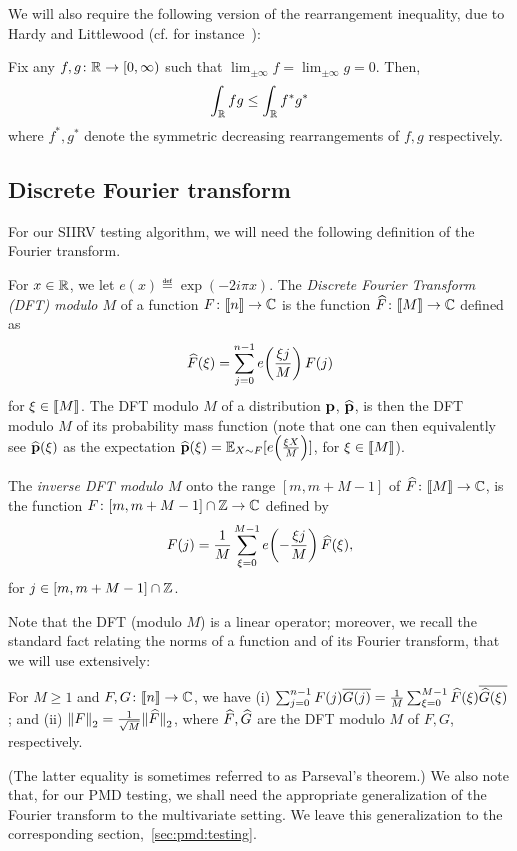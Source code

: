 We will also require the following version of the rearrangement inequality, due to Hardy and Littlewood (cf. for instance~\cite[Theorem 2.2]{BennettS:88}):
  \begin{theorem}\label{theo:hardy:littlewood}
    Fix any $f,g\colon\mathbb{R}\to [0,\infty)$ such that $\lim_{\pm\infty} f = \lim_{\pm\infty} g = 0$. Then,
    \[
        \int_{\mathbb{R}} fg \leq \int_{\mathbb{R}} f^\ast g^\ast
    \]
    where $f^\ast, g^\ast$ denote the symmetric decreasing rearrangements of $f,g$ respectively.
  \end{theorem}
  
\subsection{Discrete Fourier transform}
For our SIIRV testing algorithm, we will need the following definition of the Fourier transform. 

\begin{definition}
For $x \in \mathbb{R}$, we let $e(x) \eqdef  \exp(-2i\pi x)$. The \emph{Discrete Fourier Transform (DFT) modulo $M$} of a function
$F\colon\llbracket n\rrbracket \to \mathbb{C}$ is  the function $\widehat{F}\colon\llbracket M\rrbracket\to \mathbb{C}$ defined as
\[
    \widehat{F}(\xi)=\sum_{j=0}^{n-1} e\!\left(\frac{\xi j}{M}\right) F(j)
\]
for $\xi \in \llbracket M\rrbracket$. The DFT modulo $M$ of a distribution $\mathbf{p}$, $\widehat{\mathbf{p}}$, is then the DFT modulo $M$ of its probability mass function (note that one can then equivalently see $\widehat{\mathbf{p}}(\xi)$ as the expectation $\widehat{\mathbf{p}}(\xi) = \mathbb{E}_{X\sim F}[e\!\left(\frac{\xi X}{M}\right)]$, for $\xi\in\llbracket M\rrbracket$).

The \emph{inverse DFT modulo $M$} onto the range $[m,m+M-1]$ of $\widehat{F}\colon \llbracket M\rrbracket \to \mathbb{C}$, is the function $F\colon [m, m+M-1] \cap \mathbb{Z} \to \mathbb{C}$ defined by 
\[
    F(j)= \frac{1}{M} \sum_{\xi=0}^{M-1} e\!\left(-\frac{\xi j}{M}\right) \widehat{F}(\xi),
\]
for $j \in [m, m+M-1] \cap \mathbb{Z}$.
\end{definition}

Note that the DFT (modulo $M$) is a linear operator; moreover, we recall the standard fact relating the norms of a function and of its Fourier transform, that we will use extensively:
\begin{theorem}
For $M\geq 1$ and $F,G\colon\llbracket n\rrbracket \to \mathbb{C}$, we have (i) $\sum_{j=0}^{n-1} F(j)\overline{G(j)} =  \frac{1}{M}\sum_{\xi=0}^{M-1} \widehat{F}(\xi)\overline{\widehat{G}(\xi)}$; and (ii) ${\lVert F{\rVert}}_2= \frac{1}{\sqrt{M}}{\lVert\widehat{F}{\rVert}}_2$, 
where $\widehat{F},\widehat{G}$ are the DFT modulo $M$ of $F,G$, respectively.
\end{theorem}
\noindent(The latter equality is sometimes referred to as Parseval's theorem.) We also note that, for our PMD testing, we shall need the appropriate generalization of the Fourier transform to the multivariate setting. We leave this generalization to the corresponding section,~\cref{sec:pmd:testing}.

